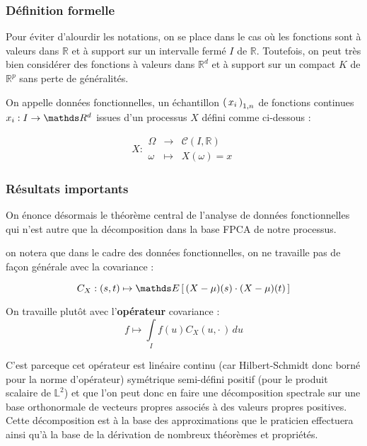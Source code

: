 \subsubsection{Définition formelle}

Pour éviter d'alourdir les notations, on se place dans le cas où les fonctions sont à valeurs dans $\mathds R$ et à support sur un intervalle fermé $I$ de $\mathds R$. Toutefois, on peut très bien considérer des fonctions à valeurs dans $\mathds R^d$ et à support sur un compact $K$ de $\mathds R^p$ sans perte de généralités.

\begin{definition}

    On appelle données fonctionnelles, un échantillon $\left( \, {x} _ {i} \, \right)_{1, n}$ de fonctions continues $x_i : I \rightarrow \R d$ issues d'un processus $X$ défini comme ci-dessous :

    $$X : 
    \begin{array}{ccc}
        \Omega & \longrightarrow & \mathcal C(I, \mathds R)
        \\
        \omega & \longmapsto & X(\omega) = x 
    \end{array}
    $$

\end{definition}

\subsubsection{Résultats importants}

On énonce désormais le théorème central de l'analyse de données fonctionnelles qui n'est autre que la décomposition dans la base FPCA de notre processus.

\begin{rem}
    on notera que dans le cadre des données fonctionnelles, on ne travaille pas de façon générale avec la covariance :
    
    $$C_X : (s,t) \mapsto \esperance{ (X - \mu)(s) \cdot (X - \mu)(t) }$$
    
    On travaille plutôt avec l'\textbf{opérateur} covariance :
    $$f \mapsto \int\limits_I f(u)C_X(u, \cdot \,) \,du$$ 
    
    C'est parceque cet opérateur est linéaire continu (car Hilbert-Schmidt donc borné pour la norme d'opérateur) symétrique semi-défini positif (pour le produit scalaire de $\mathds L^2$) et que l'on peut donc en faire une décomposition spectrale sur une base orthonormale de vecteurs propres associés à des valeurs propres positives. Cette décomposition est à la base des approximations que le praticien effectuera ainsi qu'à la base de la dérivation de nombreux théorèmes et propriétés.
\end{rem}

